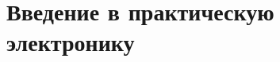 

\tableofcontents\clearpage


% 
\part{Введение в практическую электронику}\label{collis}



% 
%

%

% 

% 
% 
% 

% 

% 

\printbibliography

\printindex


